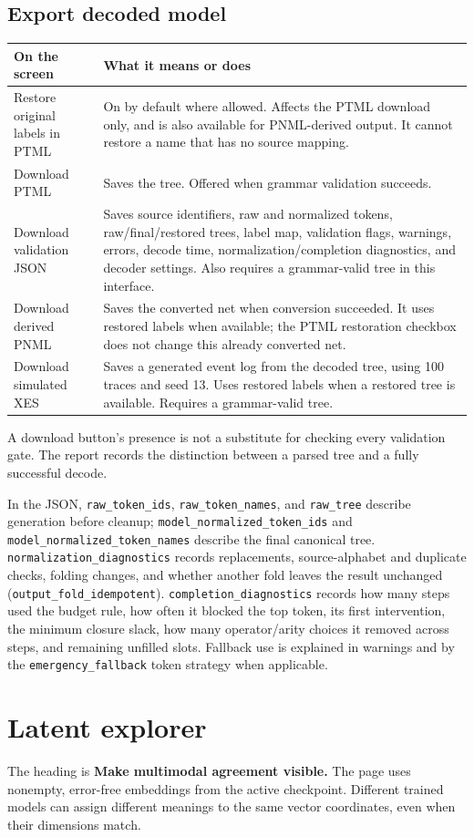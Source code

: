 \documentclass[11pt,a4paper]{article}
\makeatletter
\newcommand{\ui}[1]{\textbf{#1}}
\newcommand{\code}[1]{\nolinkurl{#1}}
\newenvironment{controls}{%
  \small\begin{longtable}{@{}>{\raggedright\arraybackslash}p{.34\linewidth}
    >{\raggedright\arraybackslash}p{.62\linewidth}@{}}
  \toprule\textbf{On the screen} & \textbf{What it means or does}\\\midrule\endhead
  \bottomrule\endfoot
}{\end{longtable}\normalsize}
\makeatother
\begin{document}
\subsection{Export decoded model}
\begin{controls}
Restore original labels in PTML & On by default where allowed. Affects the
PTML download only, and is also available for PNML-derived output. It cannot
restore a name that has no source mapping.\\
Download PTML & Saves the tree. Offered when grammar validation succeeds.\\
Download validation JSON & Saves source identifiers, raw and normalized tokens,
raw/final/restored trees, label map, validation flags, warnings, errors, decode
time, normalization/completion diagnostics, and decoder settings.
Also requires a grammar-valid tree in this interface.\\
Download derived PNML & Saves the converted net when conversion succeeded.
It uses restored labels when available; the PTML restoration checkbox does not
change this already converted net.\\
Download simulated XES & Saves a generated event log from the decoded tree,
using 100 traces and seed 13. Uses restored labels when a restored tree is
available. Requires a grammar-valid tree.\\
\end{controls}

A download button's presence is not a substitute for checking every validation
gate. The report records the distinction between a parsed tree and a fully
successful decode.

In the JSON, \code{raw_token_ids}, \code{raw_token_names}, and \code{raw_tree}
describe generation before cleanup; \code{model_normalized_token_ids} and
\code{model_normalized_token_names} describe the final canonical tree.
\code{normalization_diagnostics} records replacements, source-alphabet and
duplicate checks, folding changes, and whether another fold leaves the result
unchanged (\code{output_fold_idempotent}).
\code{completion_diagnostics} records how many steps used the budget rule,
how often it blocked the top token, its first intervention, the minimum closure
slack, how many operator/arity choices it removed across steps, and remaining
unfilled slots. Fallback use is explained in warnings and by the
\code{emergency_fallback} token strategy when applicable.

\section{Latent explorer}
\label{sec:latent}
The heading is \ui{Make multimodal agreement visible.} The page uses
nonempty, error-free embeddings from the active checkpoint. Different trained
models can assign different meanings to the same vector coordinates, even
when their dimensions match.
\end{document}
